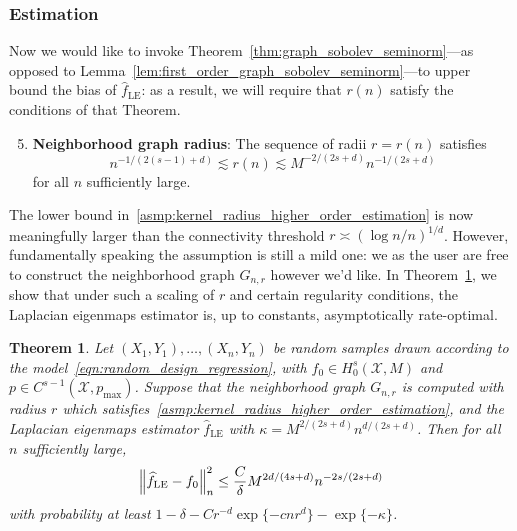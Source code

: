 \documentclass{article}
\newcommand{\1}{\mathbf{1}}
\newcommand{\Xset}{\mathcal{X}}
\newcommand{\wh}[1]{\widehat{#1}}
\newcommand{\LE}{\mathrm{LE}}
\theoremstyle{alden}
\theoremstyle{aldenthm}
\newtheorem{theorem}{Theorem}
\theoremstyle{definition}
\theoremstyle{remark}
\begin{document}
\subsubsection{Estimation}
\label{subsec:minimax_estimation_higher_order}
Now we would like to invoke Theorem~\ref{thm:graph_sobolev_seminorm}---as opposed to Lemma~\ref{lem:first_order_graph_sobolev_seminorm}---to upper bound the bias of $\wh{f}_{\LE}$: as a result, we will require that $r(n)$ satisfy the conditions of that Theorem. 
\begin{enumerate}[label=(R\arabic*)]
	\setcounter{enumi}{4}
	\item 
	\label{asmp:kernel_radius_higher_order_estimation}
	\textbf{Neighborhood graph radius}:
	The sequence of radii $r = r(n)$ satisfies
	\begin{equation*}
	n^{-1/(2(s - 1) + d)} \lesssim r(n) \lesssim M^{-2/(2s + d)}n^{-1/(2s + d)}
	\end{equation*}
	for all $n$ sufficiently large.
\end{enumerate}
The lower bound in~\ref{asmp:kernel_radius_higher_order_estimation} is now meaningfully larger than the connectivity threshold $r \asymp (\log n/n)^{1/d}$. However, fundamentally speaking the assumption is still a mild one: we as the user are free to construct the neighborhood graph $G_{n,r}$ however we'd like. In Theorem~\ref{thm:laplacian_eigenmaps_estimation_higher_order}, we show that under such a scaling of $r$ and certain regularity conditions, the Laplacian eigenmaps estimator is, up to constants, asymptotically rate-optimal.

\begin{theorem}
	\label{thm:laplacian_eigenmaps_estimation_higher_order}
	Let $(X_1,Y_1),\ldots,(X_n,Y_n)$ be random samples drawn according to the model~\eqref{eqn:random_design_regression}, with $f_0 \in H_0^s(\Xset,M)$ and $p \in C^{s - 1}(\Xset,p_{\max})$. Suppose that the neighborhood graph $G_{n,r}$ is computed with radius $r$ which satisfies~\ref{asmp:kernel_radius_higher_order_estimation}, and the Laplacian eigenmaps estimator $\wh{f}_{\LE}$ with $\kappa = M^{2/(2s + d)}n^{d/(2s + d)}$. Then for all $n$ sufficiently large,
	\begin{equation*}
	\Bigl\|\wh{f}_{\LE} - f_0\Bigr\|_n^2 \leq \frac{C}{\delta} M^{2d/(4s + d)} n^{-2s/(2s + d)}
	\end{equation*}
	with probability at least $1 - \delta -  Cr^{-d}\exp\{-cnr^d\} - \exp\{-\kappa\}$.
\end{theorem}
\end{document}

